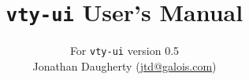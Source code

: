 \documentclass[11pt, letterpaper, oneside, titlepage]{article}
\begin{document}
\vsize 9.0in

\title{\texttt{vty-ui} User's Manual}
\author{
  For \texttt{vty-ui} version 0.5\\
  Jonathan Daugherty (\href{mailto:jtd@galois.com}{jtd@galois.com})
}
\maketitle

\tableofcontents
\newpage








\end{document}
